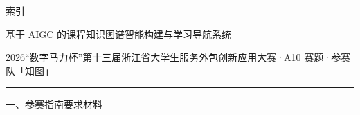 \documentclass[
    12pt,
    a4paper,
    UTF8
]{ctexart}
\begin{document}
\thispagestyle{empty}


\begin{center}
    {\heiti 索引}

    \vspace{0.35cm}

    { 基于 AIGC 的课程知识图谱智能构建与学习导航系统}

    \vspace{0.2cm}

    {\color{black!62}
    2026“数字马力杯”第十三届浙江省大学生服务外包创新应用大赛\quad·\quad A10 赛题\quad·\quad 参赛队「知图」}
\end{center}

\vspace{0.35cm}
\hrule
\vspace{0.5cm}


{\heiti\color{deepblue} 一、参赛指南要求材料}

\vspace{0.3cm}
\end{document}

